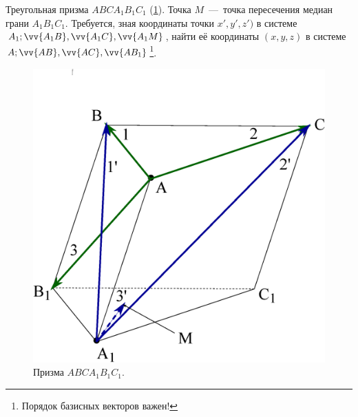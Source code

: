 \documentclass[a4paper,12pt]{article}
\begin{document}
  
  \begin{problem}[4.19]
    Треугольная призма $A B C A_1 B_1 C_1$ (\ref{fig:prism}).
    Точка $M$~---~точка пересечения медиан грани $A_1 B_1 C_1$.
    Требуется, зная координаты точки $x', y', z')$ в системе $A_1; \vv{A_1 B}, \vv{A_1 C}, \vv{A_1 M}$, найти её координаты $(x, y, z)$ в системе $A; \vv{AB}, \vv{AC}, \vv{AB_1}$\footnote{Порядок базисных векторов важен!}.
    \begin{figure}[h]
      \centering
    
      \includegraphics[width=0.5\columnwidth]{prism}
    
      \caption{Призма $ABC A_1 B_1 C_1$.}
      \label{fig:prism}
    \end{figure}
  \end{problem}
  
\end{document}

